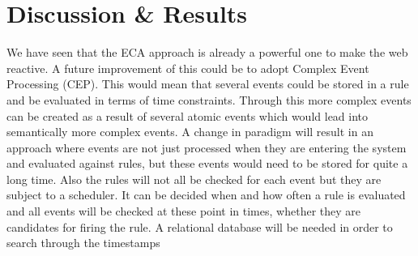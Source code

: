 
\chapter{Discussion \& Results}


%





%
We have seen that the ECA approach is already a powerful one to make the web reactive.
A future improvement of this could be to adopt Complex Event Processing (CEP).
This would mean that several events could be stored in a rule and be evaluated in terms of time constraints.
Through this more complex events can be created as a result of several atomic events which would lead into semantically more complex events.
A change in paradigm will result in an approach where events are not just processed when they are entering the system and evaluated against rules, but these events would need to be stored for quite a long time.
Also the rules will not all be checked for each event but they are subject to a scheduler.
It can be decided when and how often a rule is evaluated and all events will be checked at these point in times, whether they are candidates for firing the rule.
A relational database will be needed in order to search through the timestamps


